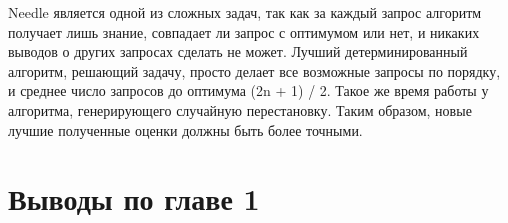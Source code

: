 Needle является одной из сложных задач, так как за каждый запрос алгоритм получает лишь знание, совпадает ли запрос с оптимумом или нет, и никаких выводов о других запросах сделать не может. Лучший детерминированный алгоритм, решающий задачу, просто делает все возможные запросы по порядку, и среднее число запросов до оптимума  (2n + 1) / 2. Такое же время работы у алгоритма, генерирующего случайную перестановку. Таким образом, новые лучшие полученные оценки должны быть более точными.

\section{Выводы по главе 1}

